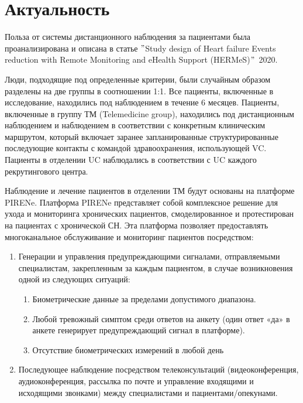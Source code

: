\section{Актуальность}\label{sec:}

Польза от системы дистанционного наблюдения за пациентами была проанализирована и описана в статье \("\)Study design of Heart failure Events reduction with Remote Monitoring and eHealth Support (HERMeS)\("\)\, 2020. \par
Люди, подходящие под определенные критерии, были случайным образом разделены на две группы в соотношении 1:1.
Все пациенты, включенные в исследование, находились под наблюдением в течение 6 месяцев.
Пациенты, включенные в группу ТМ (Telemedicine group), находились под дистанционным наблюдением и наблюдением в соответствии с конкретным клиническим маршрутом, который включает заранее запланированные структурированные последующие контакты с командой здравоохранения, использующей VC. Пациенты в отделении UC наблюдались в соответствии с UC каждого рекрутингового центра. \par
Наблюдение и лечение пациентов в отделении ТМ будут основаны на платформе PIRENe. Платформа PIRENe представляет собой комплексное решение для ухода и мониторинга хронических пациентов, смоделированное и протестирован на пациентах с хронической СН.
Эта платформа позволяет предоставлять многоканальное обслуживание и мониторинг пациентов посредством: \par
\begin{enumerate}
     пациента
    \begin{enumerate}
        \item Биометрические данные (вес, ЧСС и АД);
        \item Отчет о симптомах: семь вопросов, чтобы отразить ухудшение симптомов сердечно-сосудистых заболеваний, в основном ухудшение СН, и один вопрос, чтобы отразить общее ухудшение (см.\ Таблицу~\ref{tab:timesandtenses}).
        Вопросы ставятся так, чтобы ответить «да» или «нет».
    \end{enumerate}
    \item Генерации и управления предупреждающими сигналами, отправляемыми специалистам, закрепленным за каждым пациентом, в случае возникновения одной из следующих ситуаций:
    \begin{enumerate}
        \item Биометрические данные за пределами допустимого диапазона.
        \item Любой тревожный симптом среди ответов на анкету (один ответ «да» в анкете генерирует предупреждающий сигнал в платформе).
        \item Отсутствие биометрических измерений в любой день
    \end{enumerate}
    \item Последующее наблюдение посредством телеконсультаций (видеоконференция, аудиоконференция, рассылка по почте и управление входящими и исходящими звонками) между специалистами и пациентами/опекунами.
\end{enumerate}

